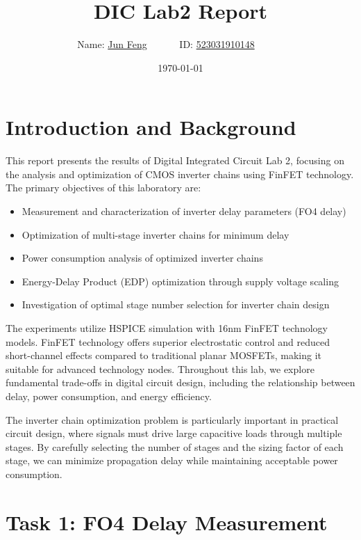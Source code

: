 \documentclass[UTF8,12pt,a4paper]{ctexart}
\title{DIC Lab2 Report}
\author{
	Name: \underline{Jun Feng}~~~~~~
	ID: \underline{523031910148}~~~~~~}
\date{\today}
\begin{document}
\fancyfoot[C]{\thepage}

\maketitle
\tableofcontents
\newpage
\section{Introduction and Background}

This report presents the results of Digital Integrated Circuit Lab 2, focusing on the analysis and optimization of CMOS inverter chains using FinFET technology. The primary objectives of this laboratory are:

\begin{itemize}
    \item Measurement and characterization of inverter delay parameters (FO4 delay)
    \item Optimization of multi-stage inverter chains for minimum delay
    \item Power consumption analysis of optimized inverter chains
    \item Energy-Delay Product (EDP) optimization through supply voltage scaling
    \item Investigation of optimal stage number selection for inverter chain design
\end{itemize}

The experiments utilize HSPICE simulation with 16nm FinFET technology models. FinFET technology offers superior electrostatic control and reduced short-channel effects compared to traditional planar MOSFETs, making it suitable for advanced technology nodes. Throughout this lab, we explore fundamental trade-offs in digital circuit design, including the relationship between delay, power consumption, and energy efficiency.

The inverter chain optimization problem is particularly important in practical circuit design, where signals must drive large capacitive loads through multiple stages. By carefully selecting the number of stages and the sizing factor of each stage, we can minimize propagation delay while maintaining acceptable power consumption.

\newpage
\section{Task 1: FO4 Delay Measurement}
\end{document}
